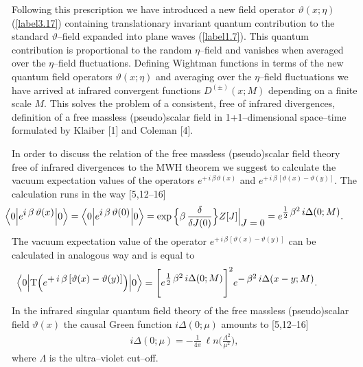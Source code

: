 \documentclass[a4paper,12pt] {article}
\begin{document}
Following this prescription we have introduced a new field operator
$\vartheta(x;\eta)$ (\ref{label3.17}) containing translationary
invariant quantum contribution to the standard $\vartheta$--field
expanded into plane waves (\ref{label1.7}). This quantum contribution
is proportional to the random $\eta$--field and vanishes when averaged
over the $\eta$--field fluctuations. Defining Wightman functions in
terms of the new quantum field operators $\vartheta(x;\eta)$ and
averaging over the $\eta$--field fluctuations we have arrived at
infrared convergent functions $D^{(\pm)}(x;M)$ depending on a finite
scale $M$. This solves the problem of a consistent, free of infrared
divergences, definition of a free massless (pseudo)scalar field in
1+1--dimensional space--time formulated by Klaiber [1] and Coleman
[4].

In order to discuss the relation of the free massless (pseudo)scalar
field theory free of infrared divergences to the MWH theorem we
suggest to calculate the vacuum expectation values of the operators
$e^{\textstyle +\,i\,\beta\,\vartheta(x)}$ and $e^{\textstyle
+\,i\,\beta\,[\vartheta(x) - \vartheta(y)]}$. The calculation runs in
the way [5,12--16]
%
\begin{eqnarray}\label{label4.1}
\hspace{-0.3in}\Big\langle 0\Big|e^{\textstyle
i\,\beta\,\vartheta(x)}\Big|0\Big\rangle =\Big\langle
0\Big|e^{\textstyle i\,\beta\,\vartheta(0)}\Big|0\Big\rangle =
\exp\Big\{\beta\,\frac{\delta}{\delta J(0)}\Big\}Z[J]\Big|_{\textstyle
J=0} = e^{\textstyle \frac{1}{2}\,\beta^2\,i\Delta(0;M)}.
\end{eqnarray}
%
The vacuum expectation value of the operator $e^{\textstyle
+\,i\,\beta\,[\vartheta(x) - \vartheta(y)]}$
can be calculated in analogous way and is equal to
%
\begin{eqnarray}\label{label4.2}
\hspace{-0.5in}\Big\langle 0\Big|{\rm T}\Big(e^{\textstyle
+\,i\,\beta\,[\vartheta(x) - \vartheta(y)]}\Big)\Big|0\Big\rangle =
\Bigg[e^{\textstyle \frac{1}{2}\,\beta^2\,i\Delta(0;M)}\Bigg]^2
e^{\textstyle -\,\beta^2\,i\Delta(x-y;M)}.
\end{eqnarray}
%
In the infrared singular quantum field theory of the free massless
(pseudo)scalar field $\vartheta(x)$ the causal Green function
$i\Delta(0;\mu)$ amounts to [5,12--16]
%
\begin{eqnarray}\label{label4.3}
i\Delta(0;\mu)=-\frac{1}{4\pi}\,{\ell
n}\Bigg(\frac{\Lambda^2}{\mu^2}\Bigg),
\end{eqnarray}
%
where $\Lambda$ is the ultra--violet cut--off.
\end{document}
